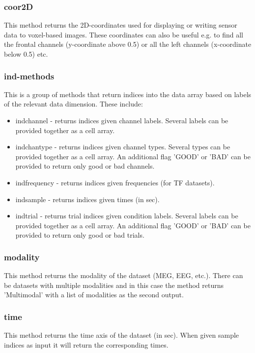 \subsubsection{coor2D}
This method returns the 2D-coordinates used for displaying or writing sensor data to voxel-based images. These coordinates can also be useful e.g. to find all the frontal channels (y-coordinate above 0.5) or all the left channels (x-coordinate below 0.5) etc.

\subsubsection{ind-methods}
This is a group of methods that return indices into the data array based on labels of the relevant data dimension. These include:

\begin{itemize}
\item indchannel - returns indices given channel labels. Several labels can be provided together as a cell array. 
\item indchantype - returns indices given channel types. Several types can be provided together as a cell array. An additional flag 'GOOD' or 'BAD' can be provided to return only good or bad channels.
\item indfrequency - returns indices given frequencies (for TF datasets).
\item indsample -  returns indices given times (in sec).
\item indtrial - returns trial indices given condition labels. Several labels can be provided together as a cell array. An additional flag 'GOOD' or 'BAD' can be provided to return only good or bad trials.
\end{itemize}

\subsubsection{modality}
This method returns the modality of the dataset (MEG, EEG, etc.). There can be datasets with multiple modalities and in this case the method returns 'Multimodal' with a list of modalities as the second output. 

\subsubsection{time}
This method returns the time axis of the dataset (in sec). When given sample indices as input it will return the corresponding times. 


